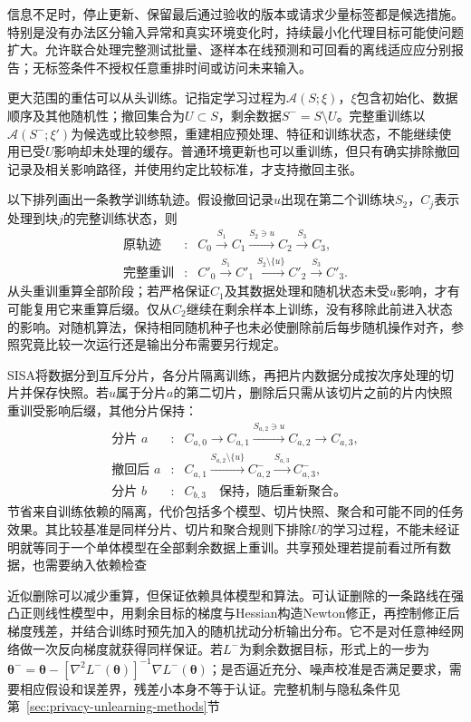 信息不足时，停止更新、保留最后通过验收的版本或请求少量标签都是候选措施。特别是没有办法区分输入异常和真实环境变化时，持续最小化代理目标可能使问题扩大。允许联合处理完整测试批量、逐样本在线预测和可回看的离线适应应分别报告；无标签条件不授权任意重排时间或访问未来输入。

更大范围的重估可以从头训练。记指定学习过程为$\mathcal A(S;\xi)$，$\xi$包含初始化、数据顺序及其他随机性；撤回集合为$U\subset S$，剩余数据$S^-=S\setminus U$。完整重训练以$\mathcal A(S^-;\xi')$为候选或比较参照，重建相应预处理、特征和训练状态，不能继续使用已受$U$影响却未处理的缓存。普通环境更新也可以重训练，但只有确实排除撤回记录及相关影响路径，并使用约定比较标准，才支持撤回主张。

以下排列画出一条教学训练轨迹。假设撤回记录$u$出现在第二个训练块$S_2$，$C_j$表示处理到块$j$的完整训练状态，则
\[
\begin{array}{rcl}
\text{原轨迹}&:&
C_0\xrightarrow{S_1}C_1
\xrightarrow{S_2\ni u}C_2
\xrightarrow{S_3}C_3,\\
\text{完整重训}&:&
C'_0\xrightarrow{S_1}C'_1
\xrightarrow{S_2\setminus\{u\}}C'_2
\xrightarrow{S_3}C'_3.
\end{array}
\]
从头重训重算全部阶段；若严格保证$C_1$及其数据处理和随机状态未受$u$影响，才有可能复用它来重算后缀。仅从$C_2$继续在剩余样本上训练，没有移除此前进入状态的影响。对随机算法，保持相同随机种子也未必使删除前后每步随机操作对齐，参照究竟比较一次运行还是输出分布需要另行规定。

SISA将数据分到互斥分片，各分片隔离训练，再把片内数据分成按次序处理的切片并保存快照。若$u$属于分片$a$的第二切片，删除后只需从该切片之前的片内快照重训受影响后缀，其他分片保持：
\[
\begin{array}{rcl}
\text{分片 }a&:&
C_{a,0}\to C_{a,1}
\xrightarrow{S_{a,2}\ni u}C_{a,2}\to C_{a,3},\\
\text{撤回后 }a&:&
C_{a,1}\xrightarrow{S_{a,2}\setminus\{u\}}C^-_{a,2}
\xrightarrow{S_{a,3}}C^-_{a,3},\\
\text{分片 }b&:&C_{b,3}\quad\text{保持，随后重新聚合。}
\end{array}
\]
节省来自训练依赖的隔离，代价包括多个模型、切片快照、聚合和可能不同的任务效果。其比较基准是同样分片、切片和聚合规则下排除$U$的学习过程，不能未经证明就等同于一个单体模型在全部剩余数据上重训。共享预处理若提前看过所有数据，也需要纳入依赖检查

近似删除可以减少重算，但保证依赖具体模型和算法。可认证删除的一条路线在强凸正则线性模型中，用剩余目标的梯度与Hessian构造Newton修正，再控制修正后梯度残差，并结合训练时预先加入的随机扰动分析输出分布。它不是对任意神经网络做一次反向梯度就获得同样保证。若$L^-$为剩余数据目标，形式上的一步为$\bm\theta^-=\bm\theta-[\nabla^2L^-(\bm\theta)]^{-1}\nabla L^-(\bm\theta)$；是否逼近充分、噪声校准是否满足要求，需要相应假设和误差界，残差小本身不等于认证。完整机制与隐私条件见第~\ref{sec:privacy-unlearning-methods}节

